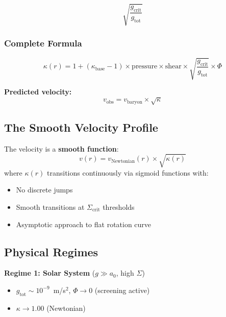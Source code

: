 \documentclass[11pt,a4paper]{article}
\theoremstyle{definition}
\theoremstyle{remark}
\begin{document}
	\begin{equation}
		\sqrt{\frac{g_{\text{crit}}}{g_{\text{tot}}}}
		\label{eq:geometric_impedance}
	\end{equation}
	
	\subsubsection{Complete Formula}
	
	\begin{equation}
		\boxed{\kappa(r) = 1 + (\kappa_{\text{base}} - 1) \times \text{pressure} \times \text{shear} \times \sqrt{\frac{g_{\text{crit}}}{g_{\text{tot}}}} \times \Phi}
		\label{eq:kappa_complete}
	\end{equation}
	
	\textbf{Predicted velocity:}
	\begin{equation}
		v_{\text{obs}} = v_{\text{baryon}} \times \sqrt{\kappa}
		\label{eq:v_prediction}
	\end{equation}
	
	\subsection{The Smooth Velocity Profile}
	
	The velocity is a \textbf{smooth function}:
	\begin{equation}
		v(r) = v_{\text{Newtonian}}(r) \times \sqrt{\kappa(r)}
		\label{eq:v_smooth}
	\end{equation}
	where $\kappa(r)$ transitions continuously via sigmoid functions with:
	\begin{itemize}
		\item No discrete jumps
		\item Smooth transitions at $\Sigma_{\text{crit}}$ thresholds
		\item Asymptotic approach to flat rotation curve
	\end{itemize}
	
	\subsection{Physical Regimes}
	
	\textbf{Regime 1: Solar System} ($g \gg a_0$, high $\Sigma$)
	\begin{itemize}
		\item $g_{\text{tot}} \sim 10^{-9}$~m/s$^2$, $\Phi \to 0$ (screening active)
		\item \textbf{$\kappa \to 1.00$} (Newtonian)
	\end{itemize}
	
\end{document}
